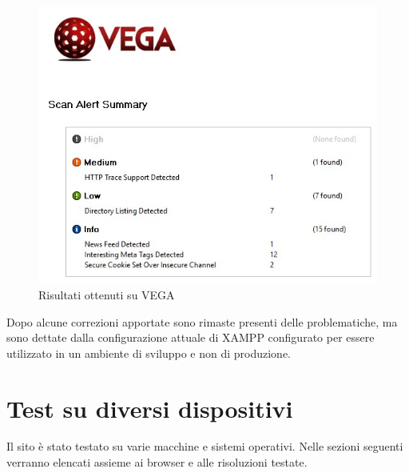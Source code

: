 \documentclass[openany, a4paper, 12pt]{report}
\begin{document}
			\begin{figure}[H]
				\centering
				\includegraphics[width=0.8\linewidth]{images/VEGA}
				\caption{Risultati ottenuti su VEGA}
			\end{figure}
			Dopo alcune correzioni apportate sono rimaste presenti delle problematiche, ma sono dettate dalla configurazione attuale di XAMPP configurato per essere utilizzato in un ambiente di sviluppo e non di produzione.

		\section{Test su diversi dispositivi}
			Il sito è stato testato su varie macchine e sistemi operativi. Nelle sezioni seguenti verranno elencati assieme ai browser e alle risoluzioni testate.
\end{document}
